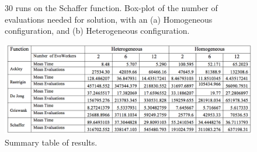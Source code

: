 \documentclass{llncs}
\begin{document}
\begin{figure}[t]
    \centering
 

    \caption{30 runs on the Schaffer function. Box-plot of the number of evaluations needed for 
      solution, with an (a) Homogeneous configuration, and (b) Heterogeneous configuration.}
    \label{fig:schaffer}
\end{figure}

\begin{figure}[t]
    \centering
        \includegraphics[width=4.5in]{img/table.png}
    \caption{Summary table of results. }
    \label{fig:summary}
\end{figure}
\end{document}
